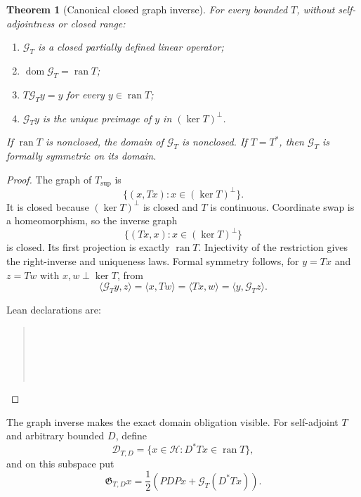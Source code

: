 \documentclass[11pt]{article}
\newtheorem{theorem}{Theorem}[section]
\theoremstyle{definition}
\theoremstyle{remark}
\newcommand{\Hh}{\mathcal H}
\newcommand{\ran}{\operatorname{ran}}
\newcommand{\kerop}{\operatorname{ker}}
\begin{document}
\begin{theorem}[Canonical closed graph inverse]
\label{thm:graphinverse}
For every bounded $T$, without self-adjointness or closed range:
\begin{enumerate}
\item $\mathcal G_T$ is a closed partially defined linear operator;
\item $\operatorname{dom}\mathcal G_T=\ran T$;
\item $T\mathcal G_Ty=y$ for every $y\in\ran T$;
\item $\mathcal G_Ty$ is the unique preimage of $y$ in $(\kerop T)^\perp$.
\end{enumerate}
If $\ran T$ is nonclosed, the domain of $\mathcal G_T$ is nonclosed.  If $T=T^*$, then
$\mathcal G_T$ is formally symmetric on its domain.
\end{theorem}

\begin{proof}
The graph of $T_{\mathrm{sup}}$ is
\[
 \{(x,Tx):x\in(\kerop T)^\perp\}.                       \tag{5.2}
\]
It is closed because $(\kerop T)^\perp$ is closed and $T$ is continuous.  Coordinate swap is a
homeomorphism, so the inverse graph
\[
 \{(Tx,x):x\in(\kerop T)^\perp\}                       \tag{5.3}
\]
is closed.  Its first projection is exactly $\ran T$.  Injectivity of the restriction gives the
right-inverse and uniqueness laws.  Formal symmetry follows, for $y=Tx$ and $z=Tw$ with
$x,w\perp\kerop T$, from
\[
 \langle\mathcal G_Ty,z\rangle
 =\langle x,Tw\rangle
 =\langle Tx,w\rangle
 =\langle y,\mathcal G_Tz\rangle.                       \tag{5.4}
\]

Lean declarations are:
\begin{quote}\footnotesize
{}\\
\\
\\
\\
\end{quote}
\end{proof}

The graph inverse makes the exact domain obligation visible.  For self-adjoint $T$ and arbitrary
bounded $D$, define
\[
 \mathcal D_{T,D}=\{x\in\Hh:D^*Tx\in\ran T\},           \tag{5.5}
\]
and on this subspace put
\[
 \mathfrak G_{T,D}x
 =\frac12\left(PDPx+\mathcal G_T(D^*Tx)\right).          \tag{5.6}
\]
\end{document}
